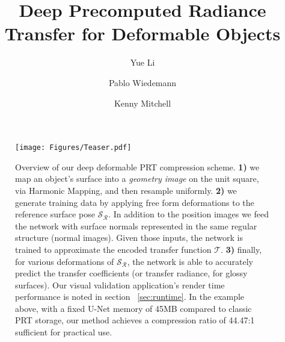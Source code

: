 \documentclass[format=acmsmall, review=false, screen=true]{acmart}
\begin{document}
\title{Deep Precomputed Radiance Transfer for Deformable Objects}

\author{Yue Li}

\author{Pablo Wiedemann}

\author{Kenny Mitchell}


\renewcommand{\shortauthors}{Li, Wiedemann, Mitchell}




\maketitle

%
\begin{figure}
  \centering
  \texttt{[image: Figures/Teaser.pdf]}
  \label{Fig: Teaser}
  \caption{Overview of our deep deformable PRT compression scheme. \textbf{1)} we map an object's surface into a \textit{geometry image}  \citep{gu2002geometry} on the unit square, via Harmonic Mapping, and then resample uniformly. \textbf{2)} we generate training data by applying free form deformations to the reference surface pose $\mathcal{S_R}$. In addition to the position images we feed the network with surface normals represented in the same regular structure (normal images). Given those inputs, the network is trained to approximate the encoded transfer function $\mathcal{T}$. \textbf{3)} finally, for various deformations of $\mathcal{S_R}$, the network is able to accurately predict the transfer coefficients (or transfer radiance, for glossy surfaces). Our visual validation application's render time performance is noted in section ~\ref{sec:runtime}. In the example above, with a fixed U-Net memory of 45MB compared to classic PRT storage, our method achieves a compression ratio of 44.47:1 sufficient for practical use.  }
\end{figure}

%
%

%

%

%

%


%


%
%
\end{document}
